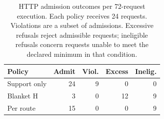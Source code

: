 \begin{table}[t]\centering\small
\caption{HTTP admission outcomes per 72-request execution. Each policy receives 24 requests. Violations are a subset of admissions. Excessive refusals reject admissible requests; ineligible refusals concern requests unable to meet the declared minimum in that condition.}
\label{tab:http}
\begin{tabular}{@{}lrrrr@{}}\toprule
Policy & Admit & Viol. & Excess & Inelig. \\ \midrule
Support only & 24 & 9 & 0 & 0 \\
Blanket H & 3 & 0 & 12 & 9 \\
Per route & 15 & 0 & 0 & 9 \\
\bottomrule\end{tabular}
\end{table}
